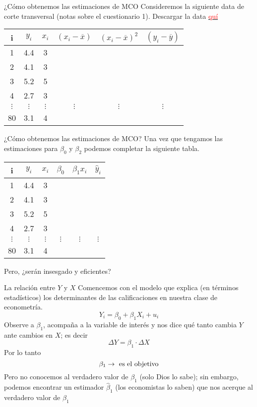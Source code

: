 \begin{frame}{¿Cómo obtenemos las estimaciones de MCO}
	Consideremos la siguiente data de corte transversal (notas sobre el cuestionario 1). Descargar la data \href{https://econweb.rutgers.edu/frojas/teaching/undergraduate/grades_data.xlsx}{\textcolor{red}{quí}}
	
	\begin{table}
		\centering
		\begin{tabular}{cccccc}
			i & $y_i$ & $x_i$ & $(x_i - \overline{x})$ & $(x_i - \overline{x})^2$ & $(y_i - \overline{y})$ \\
			\hline
			1 & 4.4 & 3 & {} & {} & {}\\
			2 & 4.1 & 3 & {} & {} & {}\\
			3 & 5.2 & 5 & {} & {} & {}\\
			4 & 2.7 & 3 & {} & {} & {}\\
			$\vdots$ & $\vdots$ & $\vdots$ & $\vdots$ & $\vdots$ & $\vdots$ \\
			80 & 3.1 & 4 & {} & {} & {} \\
			\hline
		\end{tabular}
	\end{table}
\end{frame}
\begin{frame}{¿Cómo obtenemos las estimaciones de MCO?}
	Una vez que tengamos las estimaciones para $\beta_0$ y $\beta_2$ podemos completar la siguiente tabla.
	\begin{table}
		\centering
		\begin{tabular}{cccccc}
			i & $y_i$ & $x_i$ & $\beta_0$ & $\beta_1x_i$ & $\widehat{y}_i$ \\
			\hline
			1 & 4.4 & 3 & {} & {} & {}\\
			2 & 4.1 & 3 & {} & {} & {}\\
			3 & 5.2 & 5 & {} & {} & {}\\
			4 & 2.7 & 3 & {} & {} & {}\\
			$\vdots$ & $\vdots$ & $\vdots$ & $\vdots$ & $\vdots$ & $\vdots$ \\
			80 & 3.1 & 4 & {} & {} & {} \\
			\hline
		\end{tabular}
	\end{table}
	Pero, ¿serán insesgado y eficientes?
\end{frame}
\begin{frame}{La relación entre $Y$ y $X$}
	Comencemos con el modelo que explica (en términos estadísticos) los determinantes de las calificaciones en nuestra clase de econometría.
	$$Y_i = \beta_0 + \beta_1X_i + u_i$$
	Observe a $\beta_{1}$, acompaña a la variable de interés y nos dice qué tanto cambia $Y$ ante cambios en $X$; es decir  $$\Delta Y = \beta_{1} \cdot \Delta X$$Por lo tanto $$\beta_{1} \rightarrow \textup{ es el objetivo}$$Pero no conocemos al verdadero valor de  $\beta_{1}$ (solo Dios lo sabe); sin embargo, podemos encontrar un estimador $\hat{\beta}_{1}$ (los economistas lo saben) que nos acerque al verdadero valor de $\beta_{1}$\
\end{frame}